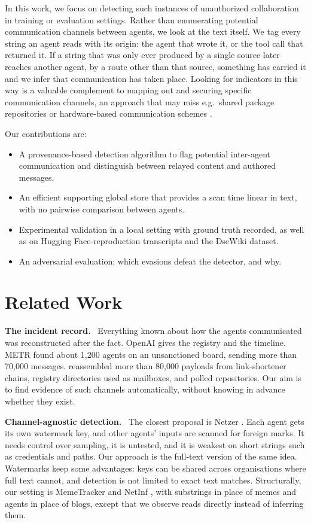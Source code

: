 \documentclass[11pt,a4paper]{article}
\newcommand{\lead}[1]{\textbf{#1}\ }
\begin{document}
In this work, we focus on detecting such instances of unauthorized collaboration in training or evaluation settings. Rather than enumerating potential communication channels between agents, we look at the text itself. We tag every string an agent reads with its origin: the agent that wrote it, or the tool call that returned it. If a string that was only ever produced by a single source later reaches another agent, by a route other than that source, something has carried it and we infer that communication has taken place. Looking for indicators in this way is a valuable complement to mapping out and securing specific communication channels, an approach that may miss e.g.\ shared package repositories \cite{openai2026a} or hardware-based communication schemes \cite{openai2026b}.

Our contributions are:
\begin{itemize}
  \item A provenance-based detection algorithm to flag potential inter-agent communication and distinguish between relayed content and authored messages.
  \item An efficient supporting global store that provides a scan time linear in text, with no pairwise comparison between agents.
  \item Experimental validation in a local setting with ground truth recorded, as well as on Hugging Face-reproduction transcripts and the DseWiki dataset.
  \item An adversarial evaluation: which evasions defeat the detector, and why.
\end{itemize}

\section{Related Work}

\lead{The incident record.} Everything known about how the agents communicated was reconstructed after the fact. OpenAI \cite{openai2026a} gives the registry and the timeline. METR \cite{metr2026} found about 1,200 agents on an unsanctioned board, sending more than 70,000 messages. \citet{forman2026} reassembled more than 80,000 payloads from link-shortener chains, registry directories used as mailboxes, and polled repositories. Our aim is to find evidence of such channels automatically, without knowing in advance whether they exist.

\lead{Channel-agnostic detection.} The closest proposal is Netzer \cite{netzer2026}. Each agent gets its own watermark key, and other agents' inputs are scanned for foreign marks. It needs control over sampling, it is untested, and it is weakest on short strings such as credentials and paths. Our approach is the full-text version of the same idea. Watermarks keep some advantages: keys can be shared across organisations where full text cannot, and detection is not limited to exact text matches. Structurally, our setting is MemeTracker and NetInf \cite{leskovec2009,gomezrodriguez2010}, with substrings in place of memes and agents in place of blogs, except that we observe reads directly instead of inferring them.
\end{document}
